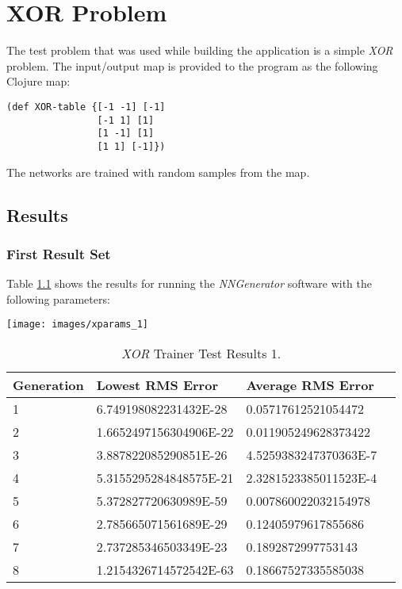 \chapter[XOR Problem]{XOR Problem}
The test problem that was used while building the application is a
simple {\it XOR} problem. 
The input/output map is provided to the program as the following
Clojure map: 

\lstset{language=Clojure}

\begin{lstlisting}
(def XOR-table {[-1 -1] [-1]
                [-1 1] [1]
                [1 -1] [1]
                [1 1] [-1]})
\end{lstlisting}

The networks are trained with random samples from the map.

\section{Results}

\subsection{First Result Set}

Table \ref{xor1} shows the results for running the {\it NNGenerator}
software with the following parameters: 

\begin{center}
\texttt{[image: images/xparams\_1]}
\end{center}

\begin{center}
    \begin{longtable}{ | l | l | l | l |}
      \caption{{\it XOR} Trainer Test Results 1.} \label{xor1} \\
    \hline
    Generation & Lowest RMS Error & Average RMS Error \\ \hline
1 &	6.749198082231432E-28 &	0.05717612521054472 \\ \hline
2 &	1.6652497156304906E-22 &	0.011905249628373422 \\ \hline
3 &	3.887822085290851E-26 &	4.5259383247370363E-7 \\ \hline
4 &	5.3155295284848575E-21 &	2.3281523385011523E-4 \\ \hline
5 &	5.372827720630989E-59 &	0.007860022032154978 \\ \hline
6 &	2.785665071561689E-29 &	0.12405979617855686 \\ \hline
7 &	2.737285346503349E-23 &	0.1892872997753143 \\ \hline
8 &	1.2154326714572542E-63 &	0.18667527335585038 \\ \hline   
\end{longtable}
\end{center}

